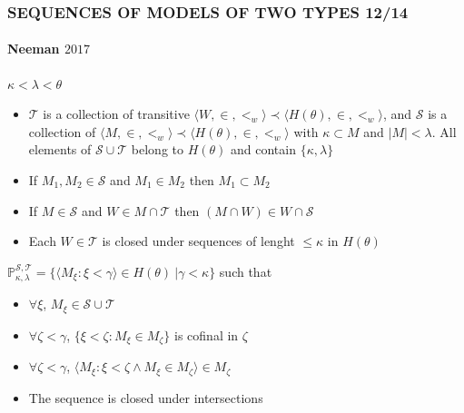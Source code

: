 \documentclass{beamer}
\begin{document}
\begin{frame}
\frametitle{SEQUENCES OF MODELS OF TWO TYPES \hspace{5mm}12/14}
\framesubtitle{Neeman $2017$}
$\kappa < \lambda < \theta$
\begin{itemize}
\item $\mathcal{T}$ is a collection of transitive $\langle W, \in, <_w \rangle \prec \langle H(\theta), \in, <_w \rangle$, and $\mathcal{S}$ is a collection of $\langle M, \in, <_w \rangle \prec \langle H(\theta), \in, <_w \rangle$ with $\kappa \subset M$ and $|M| < \lambda$. All elements of $\mathcal{S} \cup \mathcal{T}$ belong to $H(\theta)$ and contain $\{\kappa, \lambda\}$
\item If $M_1, M_2 \in \mathcal{S}$ and $M_1 \in M_2$ then $M_1 \subset M_2$
\item If $M \in \mathcal{S}$ and $W \in M \cap \mathcal{T}$ then $(M \cap W) \in W \cap \mathcal{S}$
\item Each $W \in \mathcal{T}$ is closed under sequences of lenght $\leq \kappa$ in $H(\theta)$
\end{itemize}
\begin{block}{}
$\mathbb{P}_{\kappa, \lambda}^{\mathcal{S}, \mathcal{T}}= \{ \langle M_{\xi} : \xi < \gamma \rangle \in H(\theta) \ | \gamma < \kappa \}$
such that
\begin{itemize}
\item $\forall\xi$, $M_{\xi} \in \mathcal{S} \cup \mathcal{T}$
\item $\forall \zeta < \gamma$, $\{\xi < \zeta : M_{\xi} \in M_{\zeta}\}$ is cofinal in $\zeta$
\item $\forall \zeta < \gamma$, $\langle M_{\xi} : \xi < \zeta \land M_{\xi} \in M_{\zeta} \rangle \in M_{\zeta}$
\item The sequence is closed under intersections
\end{itemize}
\end{block}
\end{frame}
\end{document}

